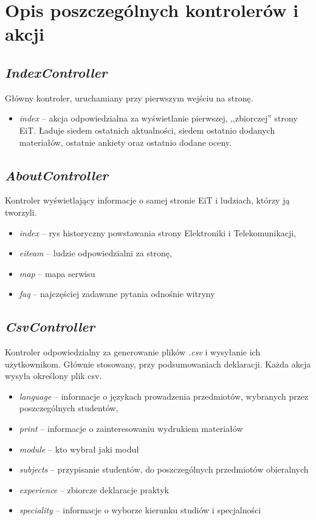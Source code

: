 \documentclass[a4paper,12pt,oneside]{report}
\begin{document}
\section{Opis poszczególnych kontrolerów i akcji}
\label{sec:kontrolery}

\subsection{\emph{IndexController}}
\label{con:index}
  Główny kontroler, uruchamiany przy pierwszym wejściu na stronę.
\begin{itemize}
  \item \emph{index} -- akcja odpowiedzialna za wyświetlanie pierwszej, ,,zbiorczej'' strony EiT. Ładuje siedem ostatnich aktualności, siedem ostatnio dodanych materiałów, ostatnie ankiety oraz ostatnio dodane oceny. 
\end{itemize}

\subsection{\emph{AboutController}}
\label{con:about}
  Kontroler wyświetlający informacje o samej stronie EiT i ludziach, którzy ją tworzyli.
\begin{itemize}
  \item \emph{index} -- rys historyczny powstawania strony Elektroniki i Telekomunikacji,
  \item \emph{eiteam} -- ludzie odpowiedzialni za stronę,
  \item \emph{map} -- mapa serwisu
  \item \emph{faq} -- najczęściej zadawane pytania odnośnie witryny
\end{itemize}

\subsection{\emph{CsvController}}
\label{con:csv}
  Kontroler odpowiedzialny za generowanie plików \emph{.csv} i wysyłanie ich użytkownikom. Głównie stosowany, przy podsumowaniach deklaracji. Każda akcja wysyła określony plik csv.
\begin{itemize}
  \item \emph{language} -- informacje o językach prowadzenia przedmiotów, wybranych przez poszczególnych studentów,
  \item \emph{print} -- informacje o zainteresowaniu wydrukiem materiałów
  \item \emph{module} -- kto wybrał jaki moduł
  \item \emph{subjects} -- przypisanie studentów, do poszczególnych przedmiotów obieralnych
  \item \emph{experience} -- zbiorcze deklaracje praktyk
  \item \emph{speciality} -- informacje o wyborze kierunku studiów i specjalności
\end{itemize}
\end{document}
